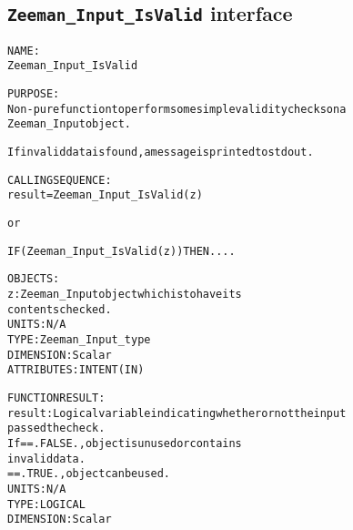 \subsection{\texttt{Zeeman\_Input\_IsValid} interface}
  \label{sec:Zeeman_Input_IsValid_interface}
  \begin{alltt}
 
  NAME:
        Zeeman_Input_IsValid
 
  PURPOSE:
        Non-pure function to perform some simple validity checks on a
        Zeeman_Input object. 
 
        If invalid data is found, a message is printed to stdout.
 
  CALLING SEQUENCE:
        result = Zeeman_Input_IsValid( z )
 
          or
 
        IF ( Zeeman_Input_IsValid( z ) ) THEN....
 
  OBJECTS:
        z:         Zeeman_Input object which is to have its
                   contents checked.
                   UNITS:      N/A
                   TYPE:       Zeeman_Input_type
                   DIMENSION:  Scalar
                   ATTRIBUTES: INTENT(IN)
 
  FUNCTION RESULT:
        result:    Logical variable indicating whether or not the input
                   passed the check.
                   If == .FALSE., object is unused or contains
                                  invalid data.
                      == .TRUE.,  object can be used.
                   UNITS:      N/A
                   TYPE:       LOGICAL
                   DIMENSION:  Scalar
 
  \end{alltt}
